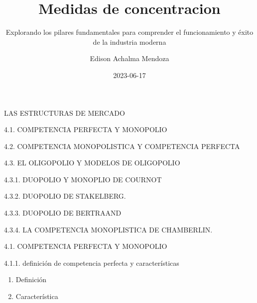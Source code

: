 \documentclass[
  letterpaper,
  DIV=11,
  numbers=noendperiod]{scrartcl}
\title{Medidas de concentracion}
\subtitle{Explorando los pilares fundamentales para comprender el
funcionamiento y éxito de la industria moderna}
\author{Edison Achalma Mendoza}
\date{2023-06-17}
\providecommand{\tightlist}{%
  \setlength{\itemsep}{0pt}\setlength{\parskip}{0pt}}\usepackage{longtable,booktabs,array}
\begin{document}
\maketitle
\ifdefined\Shaded\renewenvironment{Shaded}{\begin{tcolorbox}[borderline west={3pt}{0pt}{shadecolor}, breakable, interior hidden, frame hidden, enhanced, boxrule=0pt, sharp corners]}{\end{tcolorbox}}\fi

LAS ESTRUCTURAS DE MERCADO

4.1. COMPETENCIA PERFECTA Y MONOPOLIO

4.2. COMPETENCIA MONOPOLISTICA Y COMPETENCIA PERFECTA

4.3. EL OLIGOPOLIO Y MODELOS DE OLIGOPOLIO

4.3.1. DUOPOLIO Y MONOPLIO DE COURNOT

4.3.2. DUOPOLIO DE STAKELBERG.

4.3.3. DUOPOLIO DE BERTRAAND

4.3.4. LA COMPETENCIA MONOPLISTICA DE CHAMBERLIN.

4.1. COMPETENCIA PERFECTA Y MONOPOLIO

4.1.1. definición de competencia perfecta y características

\begin{enumerate}
\def\labelenumi{\Alph{enumi})}
\tightlist
\item
  Definición
\item
  Característica
\end{enumerate}
\end{document}
